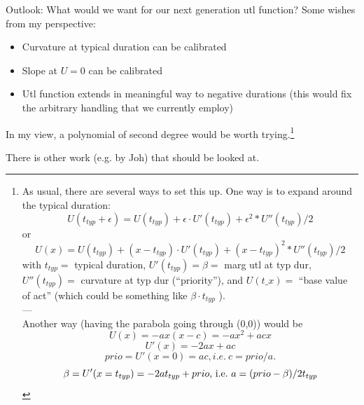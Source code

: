 Outlook: What would we want for our next generation utl function? Some wishes from my perspective:
\begin{itemize}
	\item Curvature at typical duration can be calibrated
	\item Slope at $U=0$ can be calibrated
	\item Utl function extends in meaningful way to negative durations (this would fix the arbitrary handling that we currently employ)
\end{itemize}

In  my view, a polynomial of second degree would be worth trying.\footnote{%
%
As  usual,  there are several ways to set this up. One way is to  expand around the  typical duration:
\[
U(t_{typ} + \epsilon) = U(t_{typ}) + \epsilon \cdot U'(t_{typ}) + \epsilon^2 * U''(t_{typ})/2
\]
or
\[
U(x) = U(t_{typ}) + (x-t_{typ}) \cdot U'(t_{typ}) + (x-t_{typ})^2 * U''(t_{typ})/2
\]
with $t_{typ} =$ typical duration, $U'(t_{typ}) = \beta =$ marg utl at typ dur, $U''(t_{typ}) =$  curvature at typ dur (``priority''), and $U(t\_x) =$ ``base value of act'' (which could be something like $\beta \cdot t_{typ}$ ).
\\
---
\\
Another way (having the parabola going through (0,0)) would be
\[
U(x) = - a x ( x - c ) = - a x^2 + a c x
\]
\[
U'(x) = - 2 a x + a c
\]
\[
prio = U'(x=0) = a c , i.e.\ c = prio/a .
\]
\[
\beta = U'(x=t_{typ}) = - 2 a t_{typ} + prio \hbox{, i.e.\ } a = (prio - \beta)/2t_{typ}
\]
}

There is other work (e.g. by Joh) that should be looked at.

